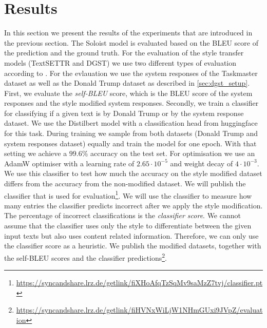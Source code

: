 \documentclass[twocolumn]{tum-article}
\begin{document}
\section{Results}
In this section we present the results of the experiments that are introduced in the previous section. The Soloist model is evaluated based on the BLEU score of the prediction and the ground truth. For the evaluation of the style transfer models (TextSETTR and DGST) we use two different types of evaluation according to \cite{riley2020textsettr}. For the evlauation we use the system responses of the Taskmaster dataset as well as the Donald Trump dataset as described in \autoref{sec:dgst_setup}. First, we evaluate the \textit{self-BLEU} score, which is the BLEU score of the system responses and the style modified system responses. Secondly, we train a classifier for classifying if a given text is by Donald Trump or by the system response dataset. We use the Distilbert model \cite{sanh2019distilbert} with a classification head from huggingface for this task. During training we sample from both datasets (Donald Trump and system responses dataset) equally and train the model for one epoch. With that setting we achieve a $99.6\%$ accuracy on the test set. For optimisation we use an AdamW optimiser \cite{loshchilov2017decoupled} with a learning rate of $2.65\cdot 10^{-5}$ and weight decay of $4\cdot 10^{-3}$. We use this classifier to test how much the accuracy on the style modified dataset differs from the accuracy from the non-modified dataset. We will publish the classifier that is used for evaluation\footnote{\url{https://syncandshare.lrz.de/getlink/fiXHoAfqTzSqMv9saMzZ7tvj/classifier.pt}}. We will use the classifier to measure how many entries the classifier predicts incorrect after we apply the style modification. The percentage of incorrect classifications is the \textit{classifier score}. We cannot assume that the classifier uses only the style to differentiate between the given input texts but also uses content related information. Therefore, we can only use the classifier score as a heuristic. We publish the modified datasets, together with the self-BLEU scores and the classifier predictions\footnote{\url{https://syncandshare.lrz.de/getlink/fiHVNxWiLjW1NHmGUxi9JVpZ/evaluation}}. 
\end{document}
